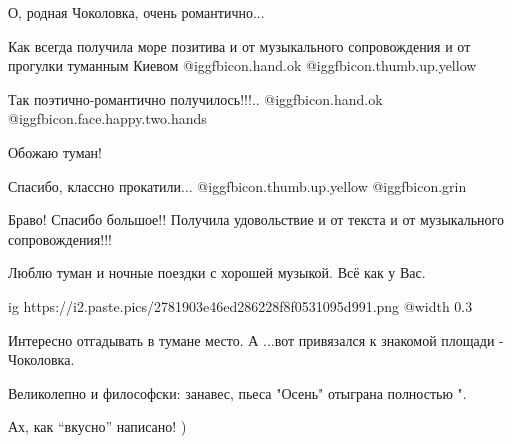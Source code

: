 \begin{itemize}
О, родная Чоколовка, очень романтично...

Как всегда получила море позитива и от музыкального сопровождения и от прогулки туманным Киевом @igg{fbicon.hand.ok}  @igg{fbicon.thumb.up.yellow} 

Так поэтично-романтично получилось!!!..  @igg{fbicon.hand.ok}  @igg{fbicon.face.happy.two.hands} 

Обожаю туман!

Спасибо, классно прокатили...  @igg{fbicon.thumb.up.yellow}  @igg{fbicon.grin} 

Браво! Спасибо большое!! Получила удовольствие и от текста и от музыкального сопровождения!!!

Люблю туман и ночные поездки с хорошей музыкой. Всё как у Вас.

\ifcmt
  ig https://i2.paste.pics/2781903e46ed286228f8f0531095d991.png
  @width 0.3
\fi

Интересно отгадывать в тумане место. А ...вот привязался к знакомой площади - Чоколовка.

Великолепно и философски: занавес, пьеса "Осень" отыграна полностью ".

Ах, как \enquote{вкусно} написано! )


\end{itemize} %
